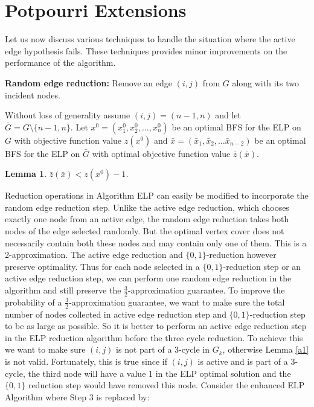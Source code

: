 \documentclass[12pt]{article}
\newtheorem{lemma}{Lemma}
\begin{document}
\section{Potpourri Extensions}

Let us now discuss various techniques to handle the situation where
the active edge hypothesis fails. These techniques provides minor
improvements on the performance of the algorithm.

\vskip 5pt

\noindent \textbf{Random edge reduction:}  Remove an edge
$(i,j)$ from $G$ along with its two incident nodes.

\vskip 5pt

Without loss of generality assume $(i,j)=(n-1,n)$ and let
$\bar{G}=G\setminus \{n-1,n\}.$  Let $x^0=(x_1^0,x_2^0,\ldots
,x_n^0)$ be an  optimal BFS for the ELP on $G$ with objective
function value $z(x^0)$ and $\bar{x}=(\bar{x}_1,\bar{x}_2,\ldots
\bar{x}_{n-2})$ be an optimal BFS for the ELP on $\bar{G}$ with
optimal objective function value $\bar{z}(\bar{x})$.

\begin{lemma}\label{3c5}$\bar{z}(\bar{x})< z(x^0)-1$.\end{lemma}

Reduction operations in Algorithm ELP can easily be modified to
incorporate the random edge reduction step. Unlike the active edge
reduction, which chooses exactly one node from an active edge, the
random edge reduction takes both nodes of the edge selected
randomly. But the optimal vertex cover does not necessarily contain
both these nodes and may contain only one of them. This is a
2-approximation. The active edge reduction and $\{0,1\}$-reduction
however preserve optimality. Thus for each node selected in a
$\{0,1\}$-reduction step or an active edge reduction step, we can
perform one random edge reduction in the algorithm and still
preserve the $\frac{3}{2}$-approximation guarantee. To improve the
probability of a $\frac{3}{2}$-approximation guarantee, we want to
make sure the total number of nodes collected in active edge
reduction step and $\{0,1\}$-reduction step to be as large as
possible. So it is better to perform an active edge reduction step
in the ELP reduction algorithm before the three cycle reduction. To
achieve this we want to make sure $(i,j)$ is not part of a 3-cycle
in $G_k$, otherwise Lemma \ref{a1} is not valid. Fortunately, this
is true since if $(i,j)$ is active and is part of a 3-cycle, the
third node will have a value 1 in the ELP optimal solution and the
$\{0,1\}$ reduction step would have removed this node. Consider the
enhanced ELP Algorithm where
Step 3 is replaced by:\\
\end{document}
